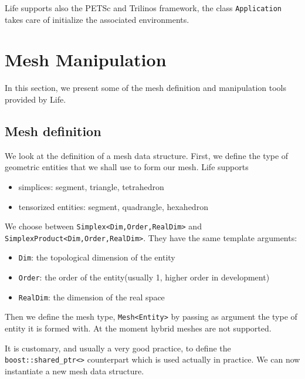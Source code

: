 \documentclass[a4paper]{book}
\begin{document}

Life supports also the PETSc and Trilinos framework, the class
\lstinline!Application! takes care of
initialize the associated environments.

\section{Mesh Manipulation}
\label{sec:mesh-manipulation}

In this section, we present some of the mesh definition and
manipulation tools provided by Life.

\subsection{Mesh definition}

We look at the definition of a mesh data structure. First, we define
the type of geometric entities that we shall use to form our mesh. Life supports
\begin{itemize}
\item simplices: segment, triangle, tetrahedron
\item tensorized entities: segment, quadrangle, hexahedron
\end{itemize}

We choose between \lstinline!Simplex<Dim,Order,RealDim>!  and
\lstinline!SimplexProduct<Dim,Order,RealDim>!. They have the same
template arguments:
\begin{itemize}
\item \lstinline!Dim!: the topological dimension of the entity
\item \lstinline!Order!: the order of the entity(usually 1, higher order in development)
\item \lstinline!RealDim!: the dimension of the real space
\end{itemize}




Then we define the mesh type, \lstinline!Mesh<Entity>! by passing as
argument the type of entity it is formed with. At the moment hybrid
meshes are not supported.



It is customary, and usually a very good practice, to define the
\lstinline!boost::shared_ptr<>!  counterpart which is used actually in
practice. We can now instantiate a new mesh data structure.
\end{document}
